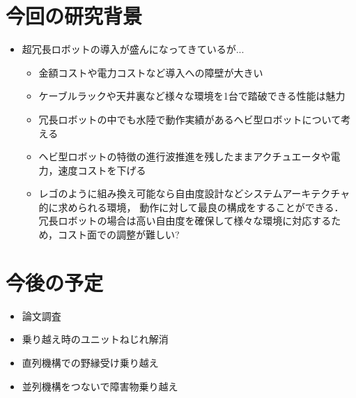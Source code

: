 \section*{今回の研究背景}
\begin{itemize}
	\item{超冗長ロボットの導入が盛んになってきているが...}
	\begin{itemize}
		\item {金額コストや電力コストなど導入への障壁が大きい}
		\item {ケーブルラックや天井裏など様々な環境を1台で踏破できる性能は魅力}
		\item {冗長ロボットの中でも水陸で動作実績があるヘビ型ロボットについて考える}
		\item {ヘビ型ロボットの特徴の進行波推進を残したままアクチュエータや電力，速度コストを下げる}
		\item {レゴのように組み換え可能なら自由度設計などシステムアーキテクチャ的に求められる環境，
		動作に対して最良の構成をすることができる．\\
		冗長ロボットの場合は高い自由度を確保して様々な環境に対応するため，コスト面での調整が難しい?}
	\end{itemize}
\end{itemize}

\section*{今後の予定}
	\begin{itemize}
		\item{論文調査}
		\item {乗り越え時のユニットねじれ解消}
		\item {直列機構での野縁受け乗り越え}
		\item {並列機構をつないで障害物乗り越え}
	\end{itemize}